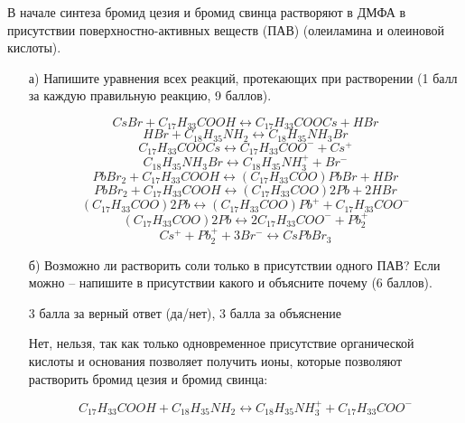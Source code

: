 
В начале синтеза бромид цезия и бромид свинца растворяют в ДМФА в присутствии поверхностно-активных веществ (ПАВ) (олеиламина и олеиновой кислоты).

\begin{enumerate}
    \item[а)] Напишите уравнения всех реакций, протекающих при растворении (1 балл за каждую правильную реакцию, 9 баллов).

    \answerMath

    $$CsBr + C_{17}H_{33}COOH \leftrightarrow C_{17}H_{33}COOCs + HBr$$
    $$HBr + C_{18}H_{35}NH_2 \leftrightarrow C_{18}H_{35}NH_3Br$$
    $$C_{17}H_{33}COOCs \leftrightarrow C_{17}H_{33}COO^- + Cs^+$$
    $$C_{18}H_{35}NH_3Br \leftrightarrow C_{18}H_{35}NH_3^+ + Br^-$$
    $$PbBr_2 + C_{17}H_{33}COOH \leftrightarrow (C
    _{17}H_{33}COO)PbBr + HBr$$
    $$PbBr_2 + C_{17}H_{33}COOH \leftrightarrow (C_{17}H_{33}COO)2Pb + 2HBr$$
    $$(C_{17}H_{33}COO)2Pb \leftrightarrow (C_{17}H_{33}COO)Pb^+ + C_{17}H_{33}COO^-$$
    $$(C_{17}H_{33}COO)2Pb \leftrightarrow 2C_{17}H_{33}COO^- + Pb_2^+$$
    $$Cs^+ + Pb_2^+ + 3Br^- \leftrightarrow CsPbBr_3$$

    \item[б)] Возможно ли растворить соли только в присутствии одного ПАВ? Если можно – напишите в присутствии какого и объясните почему (6 баллов).
    
    3 балла за верный ответ (да/нет), 3 балла за объяснение

    \answerMath

    Нет, нельзя, так как только одновременное присутствие органической кислоты и основания позволяет получить ионы, которые позволяют растворить бромид цезия и бромид свинца:

    $$C_{17}H_{33}COOH + C
    _{18}H_{35}NH_2 \leftrightarrow C_{18}H_{35}NH_3^+ + C_{17}H_{33}COO^-$$

\end{enumerate}